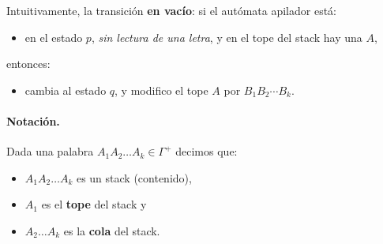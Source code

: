 Intuitivamente, la transición \textbf{en vacío}:
si el autómata apilador está:
\begin{itemize}
    \item en el estado $p$, \textit{sin lectura de una letra}, y en el tope del stack hay una $A$,
\end{itemize}
entonces:
\begin{itemize}
    \item cambia al estado $q$, y modifico el tope $A$ por $B_1B_2\cdots B_k$.
\end{itemize}


\paragraph*{Notación.} Dada una palabra $A_1A_2\ldots A_k \in \Gamma^+$ decimos que:
\begin{itemize}
    \item $A_1 A_2 \ldots A_k$ es un stack (contenido),
    \item $A_1$ es el \textbf{tope} del stack y
    \item $A_2 \ldots A_k$ es la \textbf{cola} del stack.
\end{itemize}

